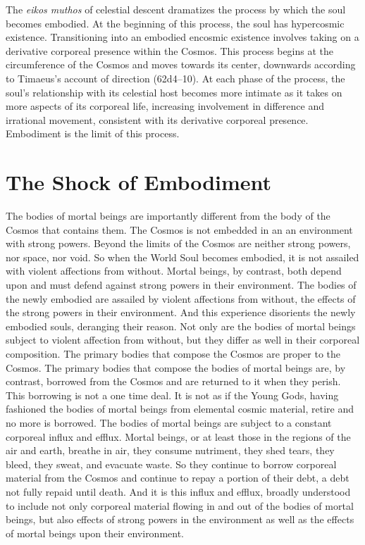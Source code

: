 The \emph{eikos muthos} of celestial descent dramatizes the process by which the soul becomes embodied. At the beginning of this process, the soul has hypercosmic existence. Transitioning into an embodied encosmic existence involves taking on a derivative corporeal presence within the Cosmos. This process begins at the circumference of the Cosmos and moves towards its center, downwards according to Timaeus's account of direction (62d4–10). At each phase of the process, the soul's relationship with its celestial host becomes more intimate as it takes on more aspects of its corporeal life, increasing involvement in difference and irrational movement, consistent with its derivative corporeal presence. Embodiment is the limit of this process. 


\section{The Shock of Embodiment} %
\label{sec:the_shock_of_embodiment}

The bodies of mortal beings are importantly different from the body of the Cosmos that contains them. The Cosmos is not embedded in an an environment with strong powers. Beyond the limits of the Cosmos are neither strong powers, nor space, nor void. So when the World Soul becomes embodied, it is not assailed with violent affections from without. Mortal beings, by contrast, both depend upon and must defend against strong powers in their environment. The bodies of the newly embodied are assailed by violent affections from without, the effects of the strong powers in their environment. And this experience disorients the newly embodied souls, deranging their reason. Not only are the bodies of mortal beings subject to violent affection from without, but they differ as well in their corporeal composition. The primary bodies that compose the Cosmos are proper to the Cosmos. The primary bodies that compose the bodies of mortal beings are, by contrast, borrowed from the Cosmos and are returned to it when they perish. This borrowing is not a one time deal. It is not as if the Young Gods, having fashioned the bodies of mortal beings from elemental cosmic material, retire and no more is borrowed. The bodies of mortal beings are subject to a constant corporeal influx and efflux. Mortal beings, or at least those in the regions of the air and earth, breathe in air, they consume nutriment, they shed tears, they bleed, they sweat, and evacuate waste. So they continue to borrow corporeal material from the Cosmos and continue to repay a portion of their debt, a debt not fully repaid until death. And it is this influx and efflux, broadly understood to include not only corporeal material flowing in and out of the bodies of mortal beings, but also effects of strong powers in the environment as well as the effects of mortal beings upon their environment.

